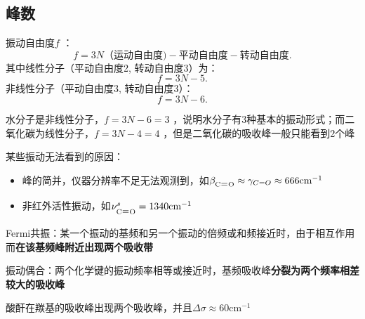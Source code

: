 \subsection{峰数}%
\label{sub:峰数}
\begin{notation}
    振动自由度$f$ ：\[
        f = 3N \text{（运动自由度)}-\text{平动自由度}-\text{转动自由度}
    .\]
    其中线性分子（平动自由度2, 转动自由度3）为：\[
        f = 3N-5
    .\]
    非线性分子（平动自由度3, 转动自由度3）：\[
        f = 3N-6
    .\]
\end{notation}
\begin{eg}
    水分子是非线性分子，$f=3N-6=3$ ，说明水分子有3种基本的振动形式；而二氧化碳为线性分子，$f = 3N-4=4$ ，但是二氧化碳的吸收峰一般只能看到2个峰
\end{eg}
某些振动无法看到的原因：
\begin{itemize}
    \item 峰的简并，仪器分辨率不足无法观测到，如$\beta_{\ce{C=O}}\approx \gamma_{C=O}\approx 666\text{cm}^{-1}$
    \item 非红外活性振动，如$\nu^{s}_{\ce{C=O}}=1340\text{cm}^{-1}$
    
\end{itemize}
\begin{notation}
    Fermi共振：某一个振动的基频和另一个振动的倍频或和频接近时，由于相互作用而\textbf{在该基频峰附近出现两个吸收带}
\end{notation}
\begin{notation}
    振动偶合：两个化学键的振动频率相等或接近时，基频吸收峰\textbf{分裂为两个频率相差较大的吸收峰}
\end{notation}
\begin{eg}
    酸酐在羰基的吸收峰出现两个吸收峰，并且$\Delta\sigma\approx 60\text{cm}^{-1}$
\end{eg}
